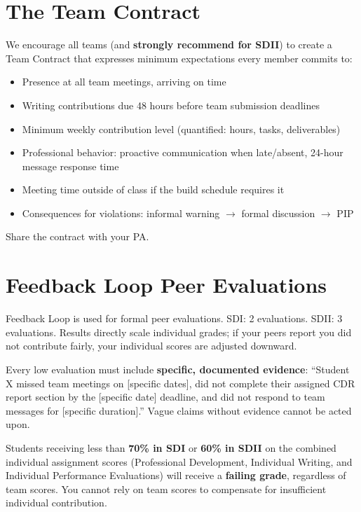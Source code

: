 \section{The Team Contract}
We encourage all teams (and \textbf{strongly recommend for SDII}) to create a Team Contract that expresses minimum expectations every member commits to:
\begin{itemize}[nosep,leftmargin=1.5em]
\item Presence at all team meetings, arriving on time
\item Writing contributions due 48 hours before team submission deadlines
\item Minimum weekly contribution level (quantified: hours, tasks, deliverables)
\item Professional behavior: proactive communication when late/absent, 24-hour message response time
\item Meeting time outside of class if the build schedule requires it
\item Consequences for violations: informal warning $\to$ formal discussion $\to$ PIP
\end{itemize}
Share the contract with your PA.

\section{Feedback Loop Peer Evaluations}
Feedback Loop is used for formal peer evaluations. SDI: 2 evaluations. SDII: 3 evaluations. Results directly scale individual grades; if your peers report you did not contribute fairly, your individual scores are adjusted downward.

Every low evaluation must include \textbf{specific, documented evidence}: ``Student X missed team meetings on [specific dates], did not complete their assigned CDR report section by the [specific date] deadline, and did not respond to team messages for [specific duration].'' Vague claims without evidence cannot be acted upon.

\begin{warningbox}
Students receiving less than \textbf{70\% in SDI} or \textbf{60\% in SDII} on the combined individual assignment scores (Professional Development, Individual Writing, and Individual Performance Evaluations) will receive a \textbf{failing grade}, regardless of team scores. You cannot rely on team scores to compensate for insufficient individual contribution.
\end{warningbox}

